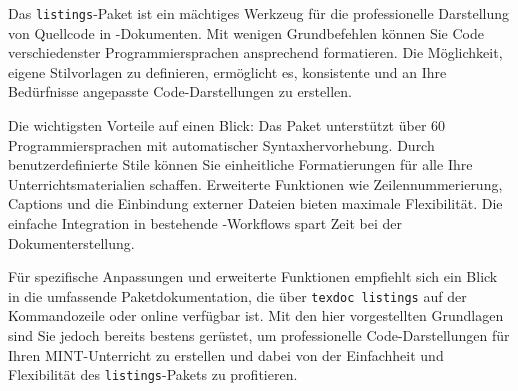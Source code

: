 Das \texttt{listings}-Paket ist ein mächtiges Werkzeug für die professionelle Darstellung von Quellcode in -Dokumenten. Mit wenigen Grundbefehlen können Sie Code verschiedenster Programmiersprachen ansprechend formatieren. Die Möglichkeit, eigene Stilvorlagen zu definieren, ermöglicht es, konsistente und an Ihre Bedürfnisse angepasste Code-Darstellungen zu erstellen.

Die wichtigsten Vorteile auf einen Blick: Das Paket unterstützt über 60 Programmiersprachen mit automatischer Syntaxhervorhebung. Durch benutzerdefinierte Stile können Sie einheitliche Formatierungen für alle Ihre Unterrichtsmaterialien schaffen. Erweiterte Funktionen wie Zeilennummerierung, Captions und die Einbindung externer Dateien bieten maximale Flexibilität. Die einfache Integration in bestehende -Workflows spart Zeit bei der Dokumenterstellung.

Für spezifische Anpassungen und erweiterte Funktionen empfiehlt sich ein Blick in die umfassende Paketdokumentation, die über \texttt{texdoc listings} auf der Kommandozeile oder online verfügbar ist. Mit den hier vorgestellten Grundlagen sind Sie jedoch bereits bestens gerüstet, um professionelle Code-Darstellungen für Ihren MINT-Unterricht zu erstellen und dabei von der Einfachheit und Flexibilität des \texttt{listings}-Pakets zu profitieren.

